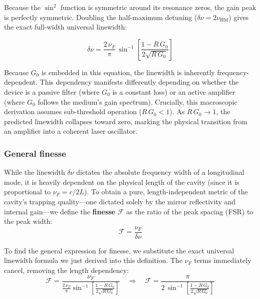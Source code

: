 Because the $\sin^2$ function is symmetric around its resonance zeros, the gain peak is perfectly symmetric. Doubling the half-maximum detuning ($\delta\nu = 2\nu_{\text{HM}}$) gives the exact full-width universal linewidth:
\begin{keyresult}
    \begin{equation}
        \delta\nu = \frac{2\,\nu_F}{\pi}\,
        \sin^{-1}\!\left[\frac{1 - R\,G_0}{2\sqrt{R\,G_0}}\right]
    \end{equation}
\end{keyresult}

Because $G_0$ is embedded in this equation, the linewidth is inherently frequency-dependent. This dependency manifests differently depending on whether the device is a passive filter (where $G_0$ is a constant loss) or an active amplifier (where $G_0$ follows the medium's gain spectrum). Crucially, this macroscopic derivation assumes sub-threshold operation ($R\,G_0 < 1$). As $R\,G_0 \to 1$, the predicted linewidth collapses toward zero, marking the physical transition from an amplifier into a coherent laser oscillator.

\subsubsection{General finesse}

While the linewidth $\delta\nu$ dictates the absolute frequency width of a longitudinal mode, it is heavily dependent on the physical length of the cavity (since it is proportional to $\nu_F = c/2L$). To obtain a pure, length-independent metric of the cavity's trapping quality---one dictated solely by the mirror reflectivity and internal gain---we define the \textbf{finesse} $\mathcal{F}$ as the ratio of the peak spacing (FSR) to the peak width:
\begin{equation*}
    \mathcal{F} = \frac{\nu_F}{\delta\nu}
\end{equation*}

To find the general expression for finesse, we substitute the exact universal linewidth formula we just derived into this definition. The $\nu_F$ terms immediately cancel, removing the length dependency:
\begin{equation*}
    \mathcal{F} = \frac{\nu_F}{\frac{2\,\nu_F}{\pi} \sin^{-1}\!\left[\frac{1 - R\,G_0}{2\sqrt{R\,G_0}}\right]} \quad \Rightarrow \quad \mathcal{F} = \frac{\pi}{2\,\sin^{-1}\!\left[\frac{1 - R\,G_0}{2\sqrt{R\,G_0}}\right]}
\end{equation*}

